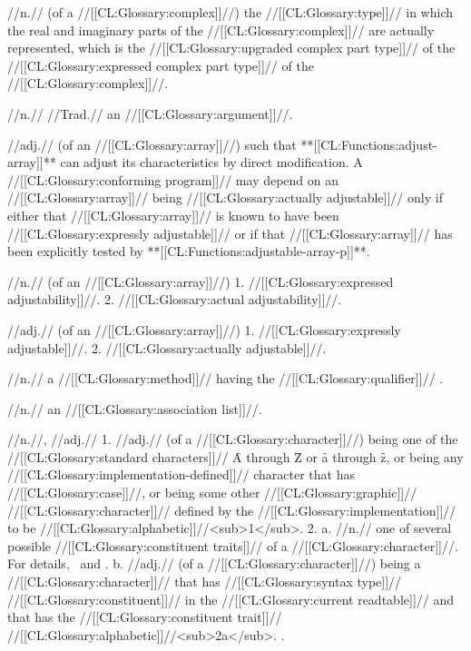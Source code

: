  //n.// (of a //[[CL:Glossary:complex]]//) the //[[CL:Glossary:type]]// in which the real and imaginary parts of the //[[CL:Glossary:complex]]// are actually represented, which is the //[[CL:Glossary:upgraded complex part type]]// of the //[[CL:Glossary:expressed complex part type]]// of the //[[CL:Glossary:complex]]//.

 //n.// //Trad.// an //[[CL:Glossary:argument]]//.

 //adj.// (of an //[[CL:Glossary:array]]//) such that **[[CL:Functions:adjust-array]]** can adjust its characteristics by direct modification. A //[[CL:Glossary:conforming program]]// may depend on an //[[CL:Glossary:array]]// being //[[CL:Glossary:actually adjustable]]// only if either that //[[CL:Glossary:array]]// is known to have been //[[CL:Glossary:expressly adjustable]]// or if that //[[CL:Glossary:array]]// has been explicitly tested by **[[CL:Functions:adjustable-array-p]]**.

 //n.// (of an //[[CL:Glossary:array]]//) 1. //[[CL:Glossary:expressed adjustability]]//. 2. //[[CL:Glossary:actual adjustability]]//.

 //adj.// (of an //[[CL:Glossary:array]]//) 1. //[[CL:Glossary:expressly adjustable]]//. 2. //[[CL:Glossary:actually adjustable]]//.

 //n.// a //[[CL:Glossary:method]]// having the //[[CL:Glossary:qualifier]]// .

 //n.// an //[[CL:Glossary:association list]]//.
 
 //n.//, //adj.// 1. //adj.// (of a //[[CL:Glossary:character]]//) being one of the //[[CL:Glossary:standard characters]]// \f{A} through \f{Z} or \f{a} through \f{z}, or being any //[[CL:Glossary:implementation-defined]]// character that has //[[CL:Glossary:case]]//, or being some other //[[CL:Glossary:graphic]]// //[[CL:Glossary:character]]// defined by the //[[CL:Glossary:implementation]]// to be //[[CL:Glossary:alphabetic]]//<sub>1</sub>. 2. a. //n.// one of several possible //[[CL:Glossary:constituent traits]]// of a //[[CL:Glossary:character]]//. For details, \seesection\ConstituentChars\ and \secref\ReaderAlgorithm. b. //adj.// (of a //[[CL:Glossary:character]]//) being a //[[CL:Glossary:character]]// that has //[[CL:Glossary:syntax type]]// //[[CL:Glossary:constituent]]// in the //[[CL:Glossary:current readtable]]// and that has the //[[CL:Glossary:constituent trait]]// //[[CL:Glossary:alphabetic]]//<sub>2a</sub>. \Seefigure\ConstituentTraitsOfStdChars.

